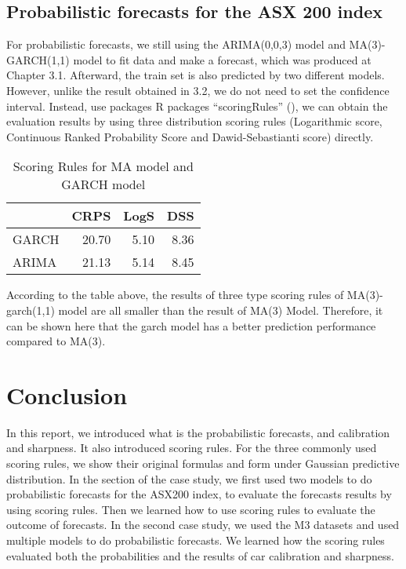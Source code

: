 \documentclass{monashthesis}
\theoremstyle{definition}
\theoremstyle{definition}
\theoremstyle{definition}
\theoremstyle{remark}
\begin{document}
\section{Probabilistic forecasts for the ASX 200
index}\label{probabilistic-forecasts-for-the-asx-200-index}

For probabilistic forecasts, we still using the ARIMA(0,0,3) model and
MA(3)-GARCH(1,1) model to fit data and make a forecast, which was
produced at Chapter 3.1. Afterward, the train set is also predicted by
two different models. However, unlike the result obtained in 3.2, we do
not need to set the confidence interval. Instead, use packages R
packages ``scoringRules'' (\textcite{JKL17}), we can obtain the
evaluation results by using three distribution scoring rules
(Logarithmic score, Continuous Ranked Probability Score and
Dawid-Sebastianti score) directly.

\begin{table}

\caption{\label{tab:table2}Scoring Rules for MA model and GARCH model}
\centering
\begin{tabular}[t]{lrrr}
\toprule
  & CRPS & LogS & DSS\\
\midrule
GARCH & 20.70 & 5.10 & 8.36\\
ARIMA & 21.13 & 5.14 & 8.45\\
\bottomrule
\end{tabular}
\end{table}

According to the table above, the results of three type scoring rules of
MA(3)-garch(1,1) model are all smaller than the result of MA(3) Model.
Therefore, it can be shown here that the garch model has a better
prediction performance compared to MA(3).

\chapter{Conclusion}\label{conclusion}

In this report, we introduced what is the probabilistic forecasts, and
calibration and sharpness. It also introduced scoring rules. For the
three commonly used scoring rules, we show their original formulas and
form under Gaussian predictive distribution. In the section of the case
study, we first used two models to do probabilistic forecasts for the
ASX200 index, to evaluate the forecasts results by using scoring rules.
Then we learned how to use scoring rules to evaluate the outcome of
forecasts. In the second case study, we used the M3 datasets and used
multiple models to do probabilistic forecasts. We learned how the
scoring rules evaluated both the probabilities and the results of car
calibration and sharpness.

\printbibliography[heading=bibintoc]
\end{document}
